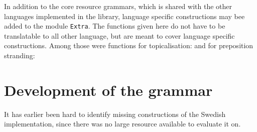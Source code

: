 \documentclass{report}
\begin{document}
In addition to the core resource grammars, which is shared with the other languages implemented in the
library, 
 language specific constructions may bee added
to the module \verb|Extra|. The functions given here do not have to be translatable
to all other language, but are meant to cover language specific constructions.
Among those were functions for topicalisation: %
\label{gfSwe:apple}
and for preposition stranding:






\section{Development of the grammar}
\label{sec:Added}
It has earlier been hard to identify missing constructions of the Swedish
implementation, since there was no large resource available to evaluate it on.
\end{document}
